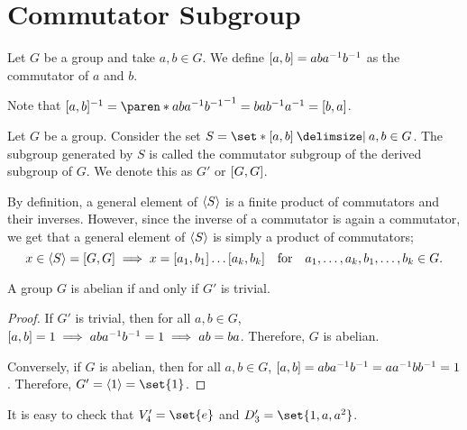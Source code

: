 \documentclass[11pt]{penrose}
\begin{document}
\section{Commutator Subgroup}
\begin{ndfn}
    Let $G$ be a group and take $a,b \in G$. We define $\lbrack a,b\rbrack = aba^{-1}b^{-1}$ as the commutator of $a$ and $b$.
\end{ndfn}

Note that $\comm{a,b}^{-1} = \paren*{aba^{-1}b^{-1}}^{-1} = bab^{-1}a^{-1} = \comm{b,a}$.

\begin{ndfn}
    Let $G$ be a group. Consider the set $S = \set*{ \comm{a,b} \st a,b \in G }$. The subgroup generated by $S$ is called the commutator subgroup of the derived subgroup of $G$. We denote this as $G'$ or $\lbrack G,G\rbrack$.
\end{ndfn}

By definition, a general element of $\langle S\rangle$ is a finite product of commutators and their inverses. However, since the inverse of a commutator is again a commutator, we get that a general element of $\langle S\rangle$ is simply a product of commutators;
\begin{equation*}
    x \in \langle S\rangle = \lbrack G,G\rbrack
    \implies
    x = \lbrack a_{1}, b_{1}\rbrack \dots \lbrack a_{k}, b_{k}\rbrack
    \quad\text{for}\quad a_{1}, \dots, a_{k}, b_{1}, \dots, b_{k} \in G.
\end{equation*}

\begin{nthm}
    A group $G$ is abelian if and only if $G'$ is trivial.
\end{nthm}
\begin{proof}
    If $G'$ is trivial, then for all $a, b \in G$, $\lbrack a,b\rbrack = 1 \implies aba^{-1}b^{-1} = 1 \implies ab = ba$. Therefore, $G$ is abelian.

    Conversely, if $G$ is abelian, then for all $a,b \in G$, $\lbrack a,b\rbrack = aba^{-1}b^{-1} = aa^{-1}bb^{-1} = 1$. Therefore, $G' = \cyclic{1} = \set{1}$.
\end{proof}

\begin{negg}
    It is easy to check that $V_{4}' = \set{e}$ and $D_{3}' = \set{1, a, a^{2}}$.
\end{negg}
\end{document}
